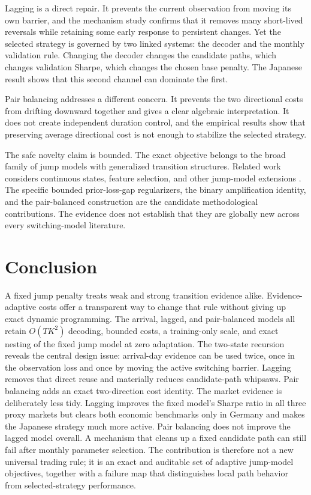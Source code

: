 Lagging is a direct repair. It prevents the current observation from moving its
own barrier, and the mechanism study confirms that it removes many short-lived
reversals while retaining some early response to persistent changes. Yet the
selected strategy is governed by two linked systems: the decoder and the monthly
validation rule. Changing the decoder changes the candidate paths, which changes
validation Sharpe, which changes the chosen base penalty. The Japanese result
shows that this second channel can dominate the first.

Pair balancing addresses a different concern. It prevents the two directional
costs from drifting downward together and gives a clear algebraic interpretation.
It does not create independent duration control, and the empirical results show
that preserving average directional cost is not enough to stabilize the selected
strategy.

The safe novelty claim is bounded. The exact objective belongs to the broad
family of jump models with generalized transition structures. Related work
considers continuous states, feature selection, and other jump-model extensions
\citep{aydinhan2024,nystrup2021}. The specific bounded prior-loss-gap
regularizers, the binary amplification identity, and the pair-balanced
construction are the candidate methodological contributions. The evidence does
not establish that they are globally new across every switching-model literature.

\section{Conclusion}

A fixed jump penalty treats weak and strong transition evidence alike.
Evidence-adaptive costs offer a transparent way to change that rule without
giving up exact dynamic programming. The arrival, lagged, and pair-balanced models
all retain $O(TK^2)$ decoding, bounded costs, a training-only scale, and exact
nesting of the fixed jump model at zero adaptation. The two-state recursion
reveals the central design issue: arrival-day evidence can be used twice, once in
the observation loss and once by moving the active switching barrier. Lagging
removes that direct reuse and materially reduces candidate-path whipsaws. Pair
balancing adds an exact two-direction cost identity. The market evidence is
deliberately less tidy. Lagging improves the fixed model's Sharpe ratio in all
three proxy markets but clears both economic benchmarks only in Germany and makes
the Japanese strategy much more active. Pair balancing does not improve the lagged
model overall. A mechanism that cleans up a fixed candidate path can still fail
after monthly parameter selection. The contribution is therefore not a new
universal trading rule; it is an exact and auditable set of adaptive jump-model
objectives, together with a failure map that distinguishes local path behavior
from selected-strategy performance.

